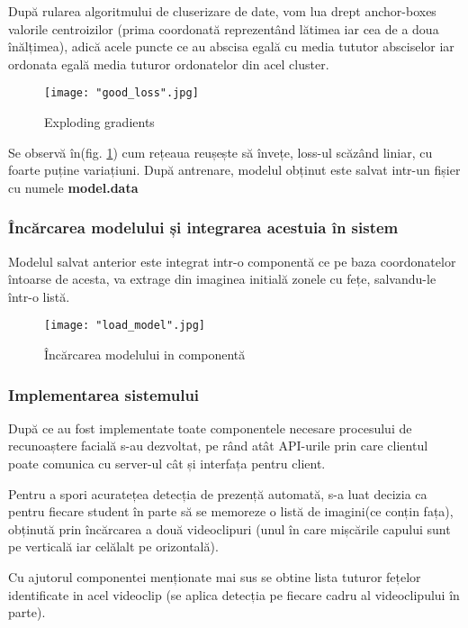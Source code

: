 \documentclass[a4paper, 12pt]{article}
\begin{document}
	După rularea algoritmului de cluserizare de date, vom lua drept anchor-boxes valorile centroizilor (prima coordonată reprezentând lătimea iar cea de a doua înălțimea), adică acele puncte ce au  abscisa egală cu media tututor absciselor iar ordonata egală media tuturor ordonatelor din acel cluster.
	
	\begin{figure}[H]
		\centering
		\texttt{[image: "good\_loss".jpg]}
		\caption{Exploding gradients}\label{fig::good_loss}
	\end{figure} 
	
	Se observă în(fig. \ref{fig::good_loss}) cum rețeaua reușește să învețe, loss-ul scăzând liniar, cu foarte puține variațiuni. După antrenare, modelul obținut este salvat intr-un fișier cu numele \textbf{model.data}
	
	
	\bigskip
	\subsubsection{Încărcarea modelului și integrarea acestuia în sistem}
	
	\quad Modelul salvat anterior este integrat intr-o componentă ce pe baza coordonatelor întoarse de acesta, va extrage din imaginea initială zonele cu fețe, salvandu-le într-o listă. 
	
	\begin{figure}[H]
		\centering
		\texttt{[image: "load\_model".jpg]}
		\caption{Încărcarea modelului in componentă}\label{fig::load_model}
	\end{figure} 
	
	\bigskip
	\subsubsection{Implementarea sistemului}
	
	\quad\space\space După ce au fost implementate toate componentele necesare procesului de recunoaștere facială s-au dezvoltat, pe rând atât API-urile prin care clientul poate comunica cu server-ul cât și interfața pentru client.
	
	Pentru a spori acuratețea detecția de prezență automată, s-a luat decizia ca pentru fiecare student în parte să se memoreze o listă de imagini(ce conțin fața), obținută prin încărcarea a două videoclipuri (unul în care mișcările capului sunt pe verticală iar celălalt pe orizontală).
	
	Cu ajutorul componentei menționate mai sus se obtine lista tuturor fețelor identificate in acel videoclip (se aplica detecția pe fiecare cadru al videoclipului în parte).
	
\end{document}
